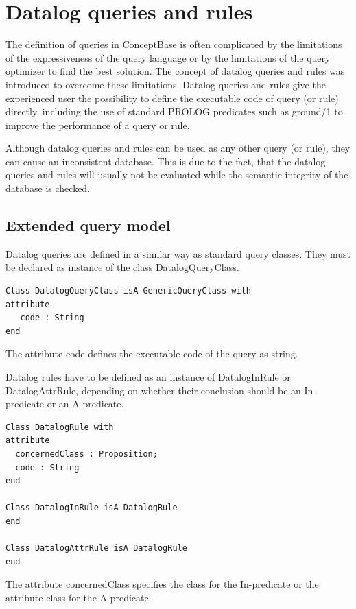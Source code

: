 \section{Datalog queries and rules}
\label{sec:datalog}

The definition of queries in ConceptBase is often complicated by the
limitations of the expressiveness of the query language or by the
limitations of the query optimizer to find the best solution.
The concept of datalog queries and rules was introduced to overcome
these limitations. Datalog queries and rules give the experienced user
the possibility to define the executable code of query (or rule) directly,
including the use of standard PROLOG predicates such as ground/1 to improve
the performance of a query or rule.

Although datalog queries and rules can be used as any other query (or rule),
they can cause an inconsistent database. This is due to the fact, that the
datalog queries and rules will usually not be evaluated while the semantic integrity
of the database is checked.

\subsection{Extended query model}

Datalog queries are defined in a similar way as standard query
classes. They must be declared as instance of the class {\ttfamily DatalogQueryClass}.

\begin{verbatim}
Class DatalogQueryClass isA GenericQueryClass with
attribute
   code : String
end
\end{verbatim}

The attribute {\ttfamily code} defines the executable code of the query as string.

Datalog rules have to be defined as an instance of {\ttfamily DatalogInRule} or {\ttfamily DatalogAttrRule},
depending on whether their conclusion should be an In-predicate or an A-predicate.

\begin{verbatim}
Class DatalogRule with
attribute
  concernedClass : Proposition;
  code : String
end

Class DatalogInRule isA DatalogRule
end

Class DatalogAttrRule isA DatalogRule
end
\end{verbatim}

The attribute {\ttfamily concernedClass} specifies the class for the In-predicate or the
attribute class for the A-predicate.

